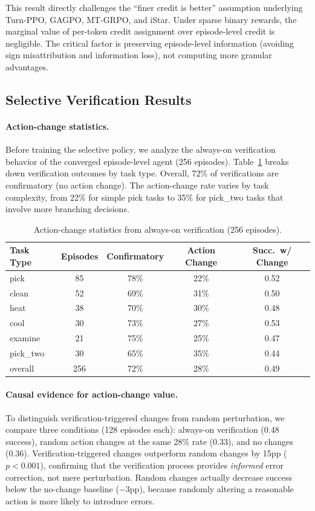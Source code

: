 \documentclass[10pt]{article}
\begin{document}
This result directly challenges the ``finer credit is better'' assumption underlying Turn-PPO, GAGPO, MT-GRPO, and iStar. Under sparse binary rewards, the marginal value of per-token credit assignment over episode-level credit is negligible. The critical factor is preserving episode-level information (avoiding sign misattribution and information loss), not computing more granular advantages.

\subsection{Selective Verification Results}

\paragraph{Action-change statistics.}
Before training the selective policy, we analyze the always-on verification behavior of the converged episode-level agent (256 episodes). Table~\ref{tab:action_change} breaks down verification outcomes by task type. Overall, 72\% of verifications are confirmatory (no action change). The action-change rate varies by task complexity, from 22\% for simple pick tasks to 35\% for pick\_two tasks that involve more branching decisions.

\begin{table}[h]
\centering
\caption{Action-change statistics from always-on verification (256 episodes).}
\label{tab:action_change}
\begin{tabular}{lcccc}
\toprule
Task Type & Episodes & Confirmatory & Action Change & Succ.\ w/ Change \\
\midrule
pick     & 85  & 78\% & 22\% & 0.52 \\
clean    & 52  & 69\% & 31\% & 0.50 \\
heat     & 38  & 70\% & 30\% & 0.48 \\
cool     & 30  & 73\% & 27\% & 0.53 \\
examine  & 21  & 75\% & 25\% & 0.47 \\
pick\_two & 30  & 65\% & 35\% & 0.44 \\
\midrule
overall  & 256 & 72\% & 28\% & 0.49 \\
\bottomrule
\end{tabular}
\end{table}

\paragraph{Causal evidence for action-change value.}
To distinguish verification-triggered changes from random perturbation, we compare three conditions (128 episodes each): always-on verification (0.48 success), random action changes at the same 28\% rate (0.33), and no changes (0.36). Verification-triggered changes outperform random changes by 15pp ($p < 0.001$), confirming that the verification process provides \emph{informed} error correction, not mere perturbation. Random changes actually decrease success below the no-change baseline ($-$3pp), because randomly altering a reasonable action is more likely to introduce errors.
\end{document}
